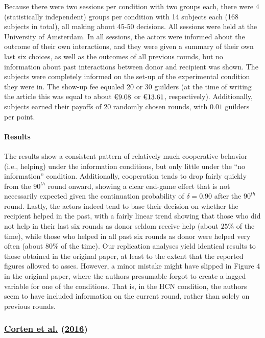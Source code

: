 \documentclass[
  11pt,
]{article}
\begin{document}
Because there were two sessions per condition with two groups each, there were 4 (statistically independent) groups per condition with 14 subjects each (168 subjects in total), all making about 45-50 decisions. All sessions were held at the University of Amsterdam. In all sessions, the actors were informed about the outcome of their own interactions, and they were given a summary of their own last six choices, as well as the outcomes of all previous rounds, but no information about past interactions between donor and recipient was shown. The subjects were completely informed on the set-up of the experimental condition they were in. The show-up fee equaled 20 or 30 guilders (at the time of writing the article this was equal to about \(\text{\texteuro}9.08\) or \(\text{\texteuro}13.61\), respectively). Additionally, subjects earned their payoffs of 20 randomly chosen rounds, with \(0.01\) guilders per point.

\hypertarget{results-3}{%
\paragraph{Results}\label{results-3}}

The results show a consistent pattern of relatively much cooperative behavior (i.e., helping) under the information conditions, but only little under the ``no information'' condition.
Additionally, cooperation tends to drop fairly quickly from the \(90^{th}\) round onward, showing a clear end-game effect that is not necessarily expected given the continuation probability of \(\delta = 0.90\) after the \(90^{th}\) round.
Lastly, the actors indeed tend to base their decision on whether the recipient helped in the past, with a fairly linear trend showing that those who did not help in their last six rounds as donor seldom receive help (about \(25\%\) of the time), while those who helped in all past six rounds as donor were helped very often (about \(80\%\) of the time).
Our replication analyses yield identical results to those obtained in the original paper, at least to the extent that the reported figures allowed to asses.
However, a minor mistake might have slipped in Figure 4 in the original paper, where the authors presumable forgot to create a lagged variable for one of the conditions.
That is, in the HCN condition, the authors seem to have included information on the current round, rather than solely on previous rounds.

\hypertarget{corten_etal_reputation_2016}{%
\subsubsection{\texorpdfstring{\protect\hyperlink{ref-corten_etal_reputation_2016}{Corten et al.} (\protect\hyperlink{ref-corten_etal_reputation_2016}{2016})}{Corten et al. (2016)}}\label{corten_etal_reputation_2016}}
\end{document}
